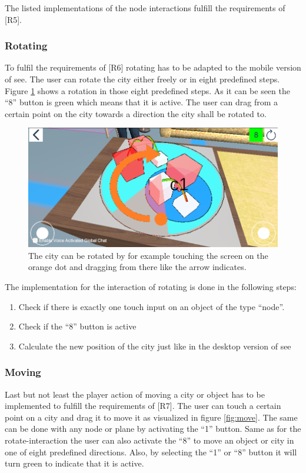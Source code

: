The listed implementations of the node interactions fulfill the requirements of [R5].

\subsubsection{Rotating}
To fulfil the requirements of [R6] rotating has to be adapted to the mobile version of \gls{see}.
The user can rotate the city either freely or in eight predefined steps.
Figure \ref{fig:rotate} shows a rotation in those eight predefined steps.
As it can be seen the \enquote{8} button is green which means that it is active.
The user can drag from a certain point on the \gls{city} towards a direction the \gls{city} shall be rotated to.

\begin{figure}[htb]
    \centering
    \includegraphics[width=1\textwidth]{Implementation/img/rotate.png}
    \caption{The \gls{city} can be rotated by for example touching the screen on the orange dot and dragging from there like the arrow indicates.}\label{fig:rotate}
\end{figure}

The implementation for the interaction of rotating is done in the following steps:
\begin{enumerate}
    \item Check if there is exactly one touch input on an object of the type \enquote{\gls{node}}.
    \item Check if the \enquote{8} button is active
    \item Calculate the new position of the \gls{city} just like in the desktop version of \gls{see}
\end{enumerate}
\subsubsection{Moving}
Last but not least the player action of moving a \gls{city} or object has to be implemented to fulfill the requirements of [R7].
The user can touch a certain point on a \gls{city} and drag it to move it as visualized in figure \ref{fig:move}.
The same can be done with any \gls{node} or \gls{plane} by activating the \enquote{1} button.
Same as for the rotate-interaction the user can also activate the \enquote{8} to move an object or city in one of eight predefined directions.
Also, by selecting the \enquote{1} or \enquote{8} button it will turn green to indicate that it is active.

